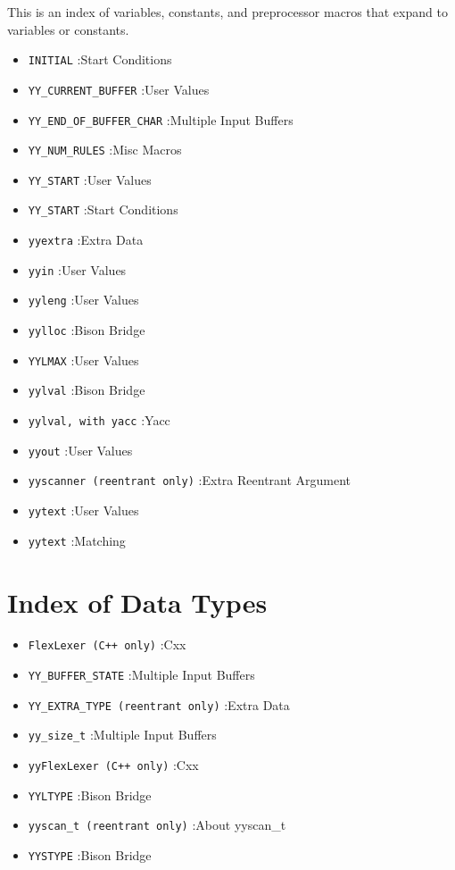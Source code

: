 \documentclass[openany,oneside]{book}
\begin{document}
This is an index of variables, constants, and preprocessor macros
that expand to variables or constants.
\begin{itemize}
\item  \verb`INITIAL` :Start Conditions
\item  \verb`YY_CURRENT_BUFFER` :User Values
\item  \verb`YY_END_OF_BUFFER_CHAR` :Multiple Input Buffers
\item  \verb`YY_NUM_RULES` :Misc Macros
\item  \verb`YY_START` :User Values
\item  \verb`YY_START` :Start Conditions
\item  \verb`yyextra` :Extra Data
\item  \verb`yyin` :User Values
\item  \verb`yyleng` :User Values
\item  \verb`yylloc` :Bison Bridge
\item  \verb`YYLMAX` :User Values
\item  \verb`yylval` :Bison Bridge
\item  \verb`yylval, with yacc` :Yacc
\item  \verb`yyout` :User Values
\item  \verb`yyscanner (reentrant only)` :Extra Reentrant Argument
\item  \verb`yytext` :User Values
\item  \verb`yytext` :Matching
\end{itemize}

\section{Index of Data Types}

\begin{itemize}
\item  \verb`FlexLexer (C++ only)` :Cxx
\item  \verb`YY_BUFFER_STATE` :Multiple Input Buffers
\item  \verb`YY_EXTRA_TYPE (reentrant only)` :Extra Data
\item  \verb`yy_size_t` :Multiple Input Buffers
\item  \verb`yyFlexLexer (C++ only)` :Cxx
\item  \verb`YYLTYPE` :Bison Bridge
\item  \verb`yyscan_t (reentrant only)` :About yyscan\_{}t
\item  \verb`YYSTYPE` :Bison Bridge
\end{itemize}
\end{document}
